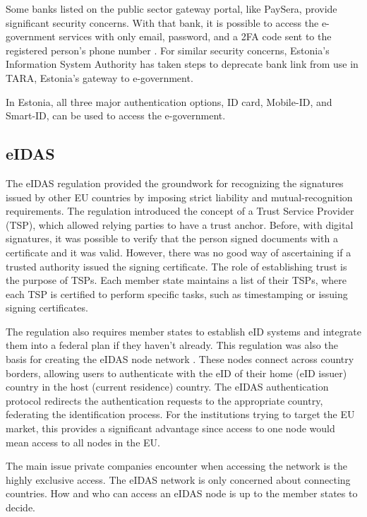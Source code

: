 Some banks listed on the public sector gateway portal, like PaySera, provide significant security concerns. With that bank, it is possible to access the e-government services with only email, password, and a 2FA code sent to the registered person's phone number . For similar security concerns, Estonia's Information System Authority has taken steps to deprecate bank link \cite{ria-deprecates-bank-link} from use in TARA, Estonia's gateway to e-government.

In Estonia, all three major authentication options, ID card, Mobile-ID, and Smart-ID, can be used to access the e-government.

\subsection{eIDAS}

The eIDAS regulation \cite{eulaw-eidas} provided the groundwork for recognizing the signatures issued by other EU countries by imposing strict liability and mutual-recognition requirements. The regulation introduced the concept of a Trust Service Provider (TSP), which allowed relying parties to have a trust anchor. Before, with digital signatures, it was possible to verify that the person signed documents with a certificate and it was valid. However, there was no good way of ascertaining if a trusted authority issued the signing certificate. The role of establishing trust is the purpose of TSPs. Each member state maintains a list of their TSPs, where each TSP is certified to perform specific tasks, such as timestamping or issuing signing certificates.

The regulation also requires member states to establish eID systems and integrate them into a federal plan if they haven't already. This regulation was also the basis for creating the eIDAS node network \cite{carretero2018federated}. These nodes connect across country borders, allowing users to authenticate with the eID of their home (eID issuer) country in the host (current residence) country. The eIDAS authentication protocol redirects the authentication requests to the appropriate country, federating the identification process. For the institutions trying to target the EU market, this provides a significant advantage since access to one node would mean access to all nodes in the EU.

The main issue private companies encounter when accessing the network is the highly exclusive access. The eIDAS network is only concerned about connecting countries. How and who can access an eIDAS node is up to the member states to decide.

